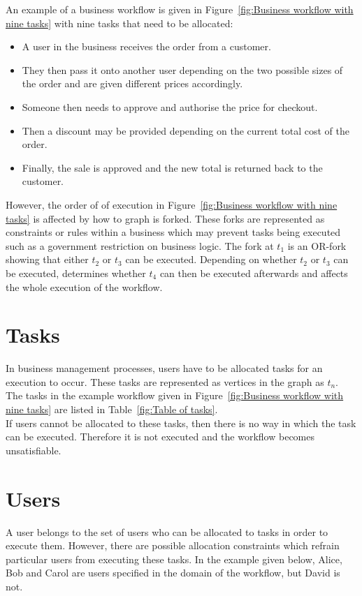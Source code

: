 \documentclass[a4paper]{report}
\begin{document}
An example of a business workflow is given in Figure~\ref{fig:Business workflow with nine tasks} with nine tasks that need to be allocated:
\begin{itemize}
\item A user in the business receives the order from a customer.
\item They then pass it onto another user depending on the two possible sizes of the order and are given different prices accordingly. 
\item Someone then needs to approve and authorise the price for checkout.
\item Then a discount may be provided depending on the current total cost of the order.
\item Finally, the sale is approved and the new total is returned back to the customer.
\end{itemize}

However, the order of of execution in Figure~\ref{fig:Business workflow with nine tasks} is affected by how to graph is forked. These forks are represented as constraints or rules within a business which may prevent tasks being executed such as a government restriction on business logic. The fork at $t_{1}$ is an OR-fork showing that either $t_{2}$ or $t_{3}$ can be executed. Depending on whether $t_{2}$ or $t_{3}$ can be executed, determines whether $t_{4}$ can then be executed afterwards and affects the whole execution of the workflow.  \\

\section{Tasks}
In business management processes, users have to be allocated tasks for an execution to occur. These tasks are represented as vertices in the graph as $t_{n}$. The tasks in the example workflow given in Figure~\ref{fig:Business workflow with nine tasks} are listed in Table~\ref{fig:Table of tasks}.\\
If users cannot be allocated to these tasks, then there is no way in which the task can be executed. Therefore it is not executed and the workflow becomes unsatisfiable.\\

\section{Users}
A user belongs to the set of users who can be allocated to tasks in order to execute them. However, there are possible allocation constraints which refrain particular users from executing these tasks. In the example given below, Alice, Bob and Carol are users specified in the domain of the workflow, but David is not.\\
\begin{center}
\end{center}
\end{document}
